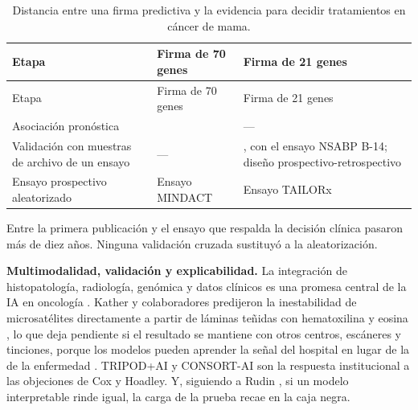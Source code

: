 \documentclass[11pt,a4paper]{article}
\begin{document}
\begingroup\small
\begin{longtable}[]{@{}
  >{\raggedright\arraybackslash}p{}
  >{\raggedright\arraybackslash}p{}
  >{\raggedright\arraybackslash}p{}@{}}
\caption{Distancia entre una firma predictiva y la evidencia para decidir tratamientos en cáncer de mama.}\label{tbl-firmas}\tabularnewline
\toprule\noalign{}
\begin{minipage}[b]{\linewidth}\raggedright
Etapa
\end{minipage} & \begin{minipage}[b]{\linewidth}\raggedright
Firma de 70 genes
\end{minipage} & \begin{minipage}[b]{\linewidth}\raggedright
Firma de 21 genes
\end{minipage} \\
\midrule\noalign{}
\endfirsthead
\toprule\noalign{}
\begin{minipage}[b]{\linewidth}\raggedright
Etapa
\end{minipage} & \begin{minipage}[b]{\linewidth}\raggedright
Firma de 70 genes
\end{minipage} & \begin{minipage}[b]{\linewidth}\raggedright
Firma de 21 genes
\end{minipage} \\
\midrule\noalign{}
\endhead
\bottomrule\noalign{}
\endlastfoot
Asociación pronóstica & \textcite{vantveer2002} & --- \\
Validación con muestras de archivo de un ensayo & --- & \textcite{paik2004}, con el ensayo NSABP B-14; diseño prospectivo-retrospectivo \autocite{simon2009} \\
Ensayo prospectivo aleatorizado & Ensayo MINDACT \autocite{cardoso2016} & Ensayo TAILORx \autocite{sparano2018} \\
\end{longtable}
\endgroup

Entre la primera publicación y el ensayo que respalda la decisión clínica pasaron más de diez años. Ninguna validación cruzada sustituyó a la aleatorización.

\textbf{Multimodalidad, validación y explicabilidad.} La integración de histopatología, radiología, genómica y datos clínicos es una promesa central de la IA en oncología \autocite{lipkova2022}. Kather y colaboradores predijeron la inestabilidad de microsatélites directamente a partir de láminas teñidas con hematoxilina y eosina \autocite{kather2019}, lo que deja pendiente si el resultado se mantiene con otros centros, escáneres y tinciones, porque los modelos pueden aprender la señal del hospital en lugar de la de la enfermedad \autocite{zech2018}. TRIPOD+AI \autocite{collins2024} y CONSORT-AI \autocite{liu2020} son la respuesta institucional a las objeciones de Cox y Hoadley. Y, siguiendo a Rudin \autocite{rudin2019}, si un modelo interpretable rinde igual, la carga de la prueba recae en la caja negra.
\end{document}
